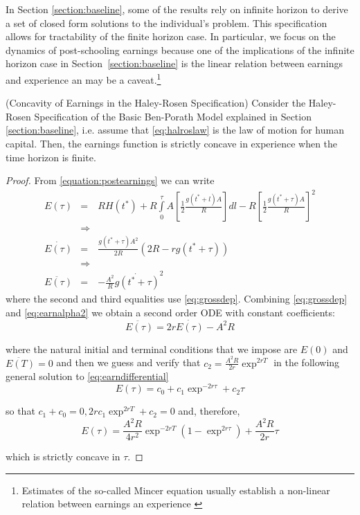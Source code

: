 \indent In Section \ref{section:baseline}, some of the results rely on infinite horizon to derive a set of closed form solutions to the individual's problem. This specification allows for tractability of the finite horizon case. In particular, we focus on the dynamics of post-schooling earnings because one of the implications of the infinite horizon case in Section~\ref{section:baseline} is the linear relation between earnings and experience an may be a caveat.\footnote{Estimates of the so-called Mincer equation usually establish a non-linear relation between earnings an experience \citep[see][]{heckman2006earnings}}\\

\begin{claim} \label{claim:concavehalros} (Concavity of Earnings in the Haley-Rosen Specification)
Consider the Haley-Rosen Specification of the Basic Ben-Porath Model explained in Section \ref{section:baseline}, i.e. assume that \eqref{eq:halroslaw} is the law of motion for human capital. Then, the earnings function is strictly concave in experience when the time horizon is finite.
\end{claim}

\begin{proof}
\indent From \eqref{equation:postearnings} we can write
\begin{eqnarray}
E(\tau) &=& RH(t^*) + R \int \limits _{0} ^{\tau} A \left[\frac{1}{2} \frac{g(t^* + l)A}{R} \right]dl - R \left[\frac{1}{2} \frac{g(t^* + \tau)A}{R} \right]^{2} \nonumber \\
&\Rightarrow& \nonumber \\
\dot{E(\tau)} &=& \frac{g (t^* + \tau)A^2}{2R}\left( 2R -rg (t^* + \tau) \right) \nonumber \\
&\Rightarrow& \nonumber \\
\ddot{E(\tau)} &=& -\frac{A^2}{R}\dot{g(t^* + \tau)}^2 \label{eq:earnalpha2}
\end{eqnarray}
where the second and third equalities use \eqref{eq:grossdep}. Combining \eqref{eq:grossdep} and \eqref{eq:earnalpha2} we obtain a second order ODE with constant coefficients:
\begin{equation}
\ddot{E(\tau)} = 2r \dot{E(\tau)} - A^2 R \label{eq:earndifferential}
\end{equation} 

\noindent where the natural initial and terminal conditions that we impose are $E(0)$ and $\ddot{E(T)} = 0$ and then we guess and verify that $c_{2} = \frac{A^2 R}{2r}\exp^{2rT}$ in the following general solution to \eqref{eq:earndifferential}
\begin{equation}
E(\tau) = c_{0} + c_{1}\exp^{-2r \tau} + c_{2} \tau
\end{equation}

\noindent so that $c_{1} + c_{0} = 0, 2rc_1 \exp^{2rT}  + c_{2} = 0$ and, therefore,
\begin{equation}
E(\tau) = \frac{A^2 R}{4r^2} \exp^{-2r T} \left( 1 - \exp^{2r \tau} \right) + \frac{A^2 R}{2r} \tau \label{eq:earningspostalpha12}
\end{equation}

\noindent which is strictly concave in $\tau$.
\end{proof}


